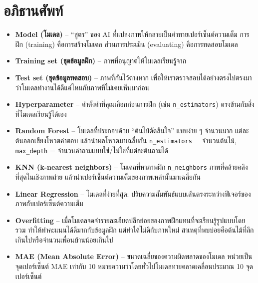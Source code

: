 \documentclass[11pt]{article}
\begin{document}
\section*{อภิธานศัพท์}
\begin{itemize}
  \item \textbf{Model (โมเดล)} -- ``สูตร'' ของ AI ที่แปลงภาพให้กลายเป็นค่าทายเปอร์เซ็นต์ความเต็ม การฝึก (training) คือการสร้างโมเดล ส่วนการประเมิน (evaluating) คือการทดสอบโมเดล
  \item \textbf{Training set (ชุดข้อมูลฝึก)} -- ภาพที่อนุญาตให้โมเดลเรียนรู้จาก
  \item \textbf{Test set (ชุดข้อมูลทดสอบ)} -- ภาพที่กันไว้ต่างหาก เพื่อให้เราตรวจสอบได้อย่างตรงไปตรงมาว่าโมเดลทำงานได้ดีแค่ไหนกับภาพที่ไม่เคยเห็นมาก่อน
  \item \textbf{Hyperparameter} -- ค่าตั้งค่าที่คุณเลือกก่อนการฝึก (เช่น \texttt{n\_estimators}) ตรงข้ามกับสิ่งที่โมเดลเรียนรู้ได้เอง
  \item \textbf{Random Forest} -- โมเดลที่ประกอบด้วย ``ต้นไม้ตัดสินใจ'' แบบง่าย ๆ จำนวนมาก แต่ละต้นออกเสียงโหวตคำตอบ แล้วนำผลโหวตมาเฉลี่ยกัน \texttt{n\_estimators} = จำนวนต้นไม้, \texttt{max\_depth} = จำนวนคำถามแบบใช่/ไม่ใช่ที่แต่ละต้นถามได้
  \item \textbf{KNN (k-nearest neighbors)} -- โมเดลที่หาภาพฝึก \texttt{n\_neighbors} ภาพที่คล้ายคลึงที่สุดในเชิงภาพถ่าย แล้วนำเปอร์เซ็นต์ความเต็มของภาพเหล่านั้นมาเฉลี่ยกัน
  \item \textbf{Linear Regression} -- โมเดลที่ง่ายที่สุด: ปรับความสัมพันธ์แบบเส้นตรงระหว่างฟีเจอร์ของภาพกับเปอร์เซ็นต์ความเต็ม
  \item \textbf{Overfitting} -- เมื่อโมเดลจดจำรายละเอียดปลีกย่อยของภาพฝึกแทนที่จะเรียนรู้รูปแบบโดยรวม ทำให้ทำคะแนนได้ดีมากกับข้อมูลฝึก แต่ทำได้ไม่ดีกับภาพใหม่ สาเหตุที่พบบ่อยคือต้นไม้ที่ลึกเกินไปหรือจำนวนเพื่อนบ้านน้อยเกินไป
  \item \textbf{MAE (Mean Absolute Error)} -- ขนาดเฉลี่ยของความผิดพลาดของโมเดล หน่วยเป็นจุดเปอร์เซ็นต์ MAE เท่ากับ 10 หมายความว่าโดยทั่วไปโมเดลทายคลาดเคลื่อนประมาณ 10 จุดเปอร์เซ็นต์
\end{itemize}
\end{document}
